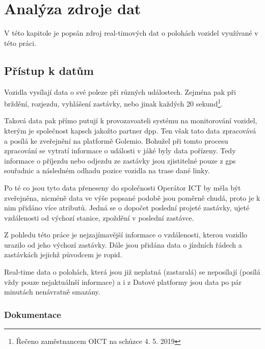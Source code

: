 \section{Analýza zdroje dat} \label{chapter:analyza_zdroje}

V této kapitole je popsán zdroj real-timových dat o polohách vozidel využívané v této práci.

\subsection{Přístup k datům}

Vozidla vysílají data o své poleze při různých událostech. Zejména pak při brždění, rozjezdu, vyhlášení zastávky, nebo jinak každých 20 sekund\footnote{Řečeno zaměstnancem OICT na schůzce 4. 5. 2019}.

\bigbreak

Taková data pak přímo putují k provozavoateli systému na monitorování vozidel, kterým je společnost \gls{kapsch} jakožto partner \gls{dpp}. Ten však tato data zpracovává a posílá ke zveřejnění na platformě Golemio. Bohužel při tomto procesu zpracování se vytratí informace o události v jáké byly data pořízeny. Tedy informace o příjezdu nebo odjezdu ze zastávky jsou zjistitelné pouze z \gls{gps} souřadnic a následném odhadu pozice vozidla na trase dané linky.

\bigbreak

Po té co jsou tyto data přeneseny do společnosti Operátor ICT by měla být zveřejněna, nicméně data ve výše popsané podobě jsou poměrně chudá, proto je k nim přidáno více atributů. Jedná se o dopočet poslední projeté zastávky, ujeté vzdálenosti od výchozí stanice, zpoždění v poslední zastávce.

\bigbreak

 Z pohledu této práce je nejzajímavější informace o vzdálenosti, kterou vozidlo urazilo od jeho výchozí zastávky. Dále jsou přidána data o jízdních řádech a zastávkách jejichž původcem je \gls{ropid}.

\bigbreak

Real-time data o polohách, která jsou již neplatná (zastaralá) se neposílají (posílá vždy pouze nejaktuálnší informace) a i z Datové platformy jsou data po pár minutách nenávratně smazány.

\subsubsection{Dokumentace}

